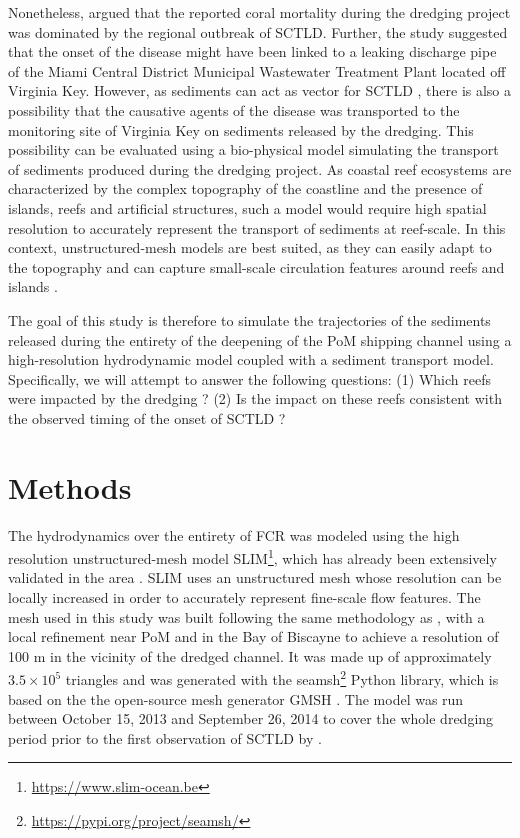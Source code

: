 \documentclass[preprint,12pt,authoryear]{elsarticle}
\begin{document}
Nonetheless, \cite{gintert2019regional} argued that the reported coral mortality during the dredging project was dominated by the regional outbreak of SCTLD. Further, the study suggested that the onset of the disease might have been linked to a leaking discharge pipe of the Miami Central District Municipal Wastewater Treatment Plant located off Virginia Key. However, as sediments can act as vector for SCTLD \citep{studivan2022reef}, there is also a possibility that the causative agents of the disease was transported to the monitoring site of Virginia Key on sediments released by the dredging. This possibility can be evaluated using a bio-physical model simulating the transport of sediments produced during the dredging project. As coastal reef ecosystems are characterized by the complex topography of the coastline and the presence of islands, reefs and artificial structures, such a model would require high spatial resolution to accurately represent the transport of sediments at reef-scale. In this context, unstructured-mesh models are best suited, as they can easily adapt to the topography \citep{fringer2019future} and can capture small-scale circulation features around reefs and islands \citep{lambrechts2008multi, figueiredo2013synthesizing}.

The goal of this study is therefore to simulate the trajectories of the sediments released during the entirety of the deepening of the PoM shipping channel using a high-resolution hydrodynamic model coupled with a sediment transport model. Specifically, we will attempt to answer the following questions: (1) Which reefs were impacted by the dredging ? (2) Is the impact on these reefs consistent with the observed timing of the onset of SCTLD ? 

\section{Methods}

The hydrodynamics over the entirety of FCR was modeled using the high resolution unstructured-mesh model SLIM\footnote{\url{ https://www.slim-ocean.be}}, which has already been extensively validated in the area \citep{frys20,dobbelaere2020coupled,dobbelaere2022}. SLIM uses an unstructured mesh whose resolution can be locally increased in order to accurately represent fine-scale flow features. The mesh used in this study was built following the same methodology as \cite{dobbelaere2022}, with a local refinement near PoM and in the Bay of Biscayne to achieve a resolution of 100 m in the vicinity of the dredged channel. It was made up of approximately $3.5\times 10^5$ triangles and was generated with the seamsh\footnote{\url{https://pypi.org/project/seamsh/}} Python library, which is based on the the open-source mesh generator GMSH \citep{geuzaine2009gmsh}. The model was run between October 15, 2013 and September 26, 2014 to cover the whole dredging period prior to the first observation of SCTLD by \cite{precht2016unprecedented}.
\end{document}
